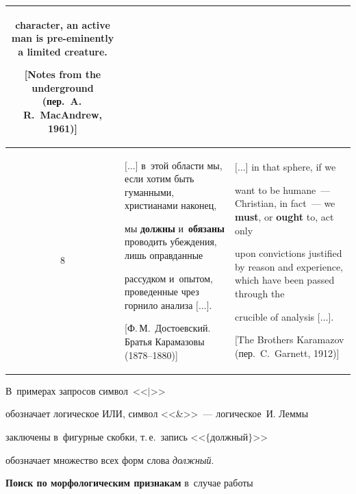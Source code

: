 \begin{table}
\begin{center}
\begin{tabular}{|c|p{57mm}|p{57mm}|}
character, an active man is pre-eminently a limited creature.\newline


[Notes from the underground (пер.\ A.\,R.~MacAndrew, 1961)]\\


\hline


8&$[$$\ldots$$]$ в~этой области мы, если хотим быть гуманными, христианами наконец, 


мы \textbf{должны} и~\textbf{обязаны} проводить убеждения, лишь оправданные 


рассудком и~опытом, проведенные чрез горнило анализа $[$$\ldots$$]$.\newline


[Ф.\,М.~Достоевский. Братья Карамазовы (1878--1880)]&$[$$\ldots$$]$ in that sphere, if we 


want to be humane~--- Christian, in fact~--- we \textbf{must}, or \textbf{ought} to, act only 


upon convictions justified by reason and experience, which have been passed through the 


crucible of analysis $[$$\ldots$$]$.\newline


[The Brothers Karamazov (пер.\ C.~Garnett, 1912)]\\


\hline


\end{tabular}


\end{center}


\vspace*{-24pt}


\end{table}


В~примерах запросов символ~<<$\vert$>> 


обозначает логическое ИЛИ, символ <<\&>>~--- логическое~И. Леммы 


заключены в~фигурные скобки, т.\,е.\ запись <<$\{$должный$\}$>> 


обозначает множество всех форм слова \textit{должный}.


{%





}





\textbf{Поиск по морфологическим признакам} в~случае работы 


